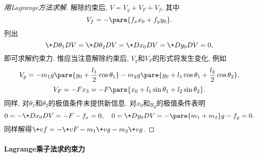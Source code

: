 \documentclass{ctexart}
\begin{document}
\begin{sample}
\begin{proof}[用Lagrange方法求解]
        解除约束后, $V=V_g + V_F + V_f$, 其中
        \[ V_f = -\pare{f_x x_0 + f_y y_0}. \]
        列出
        \[ \+D{\theta_1}DV = \+D{\theta_2}DV = \+D{x_0}DV = \+D{y_0}DV = 0, \]
        即可求解约束力. 惟应当注意解除约束后, $V_g$和$V_F$的形式将发生变化, 例如
        \[ V_g = -m_1 g\pare{y_0 + \frac{l_1}{2}\cos\theta_1} - m_2 g\pare{y_0 + l_1\cos\theta_1 + \frac{l_2}{2}\cos\theta_2}, \]
        \[ V_F = -Fx_3 = -F\pare{x_0 + l_1\sin\theta_1 + l_2\sin\theta_2}. \]
        同样, 对$\theta_1$和$\theta_2$的极值条件未提供新信息. 对$x_0$和$y_0$的极值条件表明
        \[ 0 = -\+D{x_0}D{V} = -F - f_x = 0,\quad 0 = \+D{y_0}DV = -\pare{m_1+m_2}g - f_y = 0. \]
        同样解得$\+vf = -\+vF - m_1\+vg - m_2\+vg$.
    \end{proof}
\end{sample}


\paragraph{Lagrange乘子法求约束力} %
\label{par:lagrange乘子法求约束力}
\end{document}
